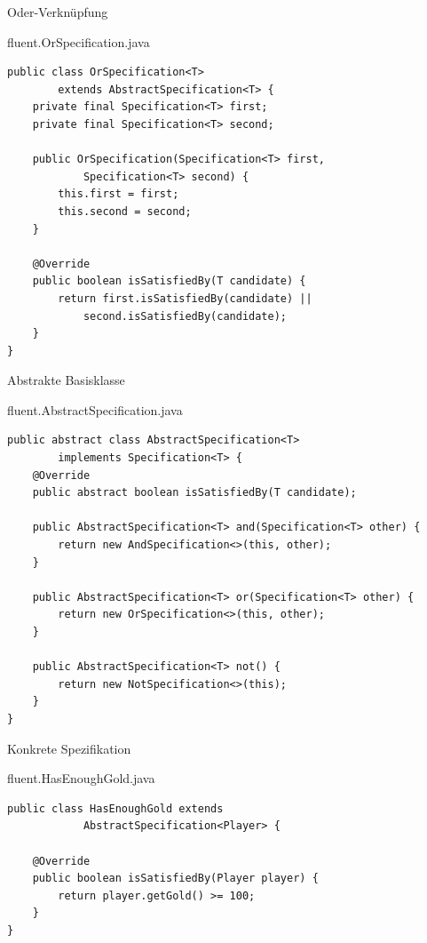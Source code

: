 \begin{frame}[fragile]{Oder-Verknüpfung}
	\begin{exampleblock}{fluent.OrSpecification.java}
		\begin{lstlisting}
public class OrSpecification<T> 
		extends AbstractSpecification<T> {
    private final Specification<T> first;
    private final Specification<T> second;

    public OrSpecification(Specification<T> first,
    		Specification<T> second) {
        this.first = first;
        this.second = second;
    }

    @Override
    public boolean isSatisfiedBy(T candidate) {
        return first.isSatisfiedBy(candidate) || 
        	second.isSatisfiedBy(candidate);
    }
}
		\end{lstlisting}
	\end{exampleblock}
\end{frame}

\begin{frame}[fragile]{Abstrakte Basisklasse}
	\begin{exampleblock}{fluent.AbstractSpecification.java}
		\begin{lstlisting}
public abstract class AbstractSpecification<T> 
		implements Specification<T> {
    @Override
    public abstract boolean isSatisfiedBy(T candidate);

    public AbstractSpecification<T> and(Specification<T> other) {
        return new AndSpecification<>(this, other);
    }

    public AbstractSpecification<T> or(Specification<T> other) {
        return new OrSpecification<>(this, other);
    }

    public AbstractSpecification<T> not() {
        return new NotSpecification<>(this);
    }
}
		\end{lstlisting}
	\end{exampleblock}
\end{frame}

\begin{frame}[fragile]{Konkrete Spezifikation}
	\begin{exampleblock}{fluent.HasEnoughGold.java}
		\begin{lstlisting}
public class HasEnoughGold extends 
			AbstractSpecification<Player> {

    @Override
    public boolean isSatisfiedBy(Player player) {
        return player.getGold() >= 100;
    }
}
		\end{lstlisting}
	\end{exampleblock}
\end{frame}

